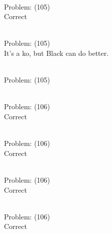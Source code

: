 \documentclass[11pt]{article}
\begin{document}
\begin{minipage}[t]{0.5\textwidth}
  {\centering
  
\\
Problem: (105)\\
Correct\\
  }
\end{minipage}
\begin{minipage}[t]{0.5\textwidth}
  {\centering
  
\\
Problem: (105)\\
It's a ko, but Black can do better.\\
  }
\end{minipage}
\begin{minipage}[t]{0.5\textwidth}
  {\centering
  
\\
Problem: (105)\\
  }
\end{minipage}
\begin{minipage}[t]{0.5\textwidth}
  {\centering
  
\\
Problem: (106)\\
Correct\\
  }
\end{minipage}
\begin{minipage}[t]{0.5\textwidth}
  {\centering
  
\\
Problem: (106)\\
Correct\\
  }
\end{minipage}
\begin{minipage}[t]{0.5\textwidth}
  {\centering
  
\\
Problem: (106)\\
Correct\\
  }
\end{minipage}
\begin{minipage}[t]{0.5\textwidth}
  {\centering
  
\\
Problem: (106)\\
Correct\\
  }
\end{minipage}
\end{document}
